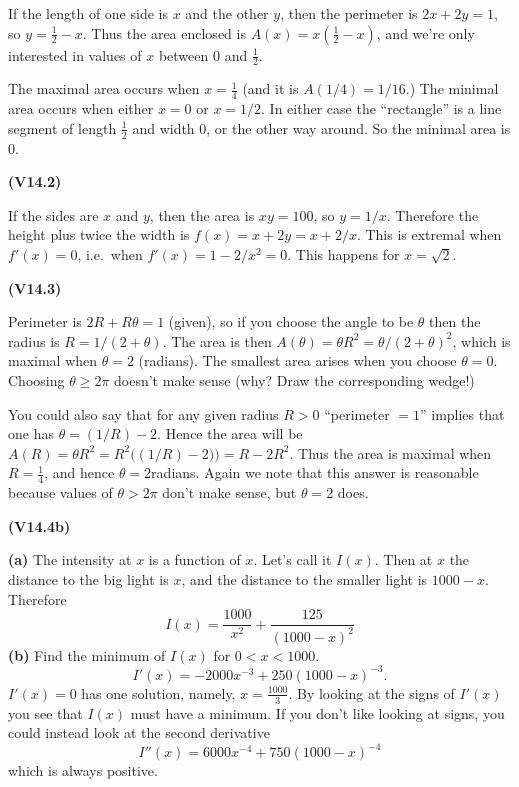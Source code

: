 \documentclass[openany,reqno]{amsbook}
\begin{document}
\begin{trivlist}
  If the length of one side is $x$ and the other $y$, then the perimeter
  is $2x+2y = 1$, so $y=\frac12-x$.  Thus the area enclosed is $A(x) =
  x(\frac12 - x)$, and we're only interested in values of $x$ between
  $0$ and $\tfrac12$.

  The maximal area occurs when $x=\tfrac14$ (and it is $A(1/4) = 1/16$.)
  The minimal area occurs when either $x=0$ or $x=1/2$.  In either case
  the ``rectangle'' is a line segment of length $\frac12$ and width 0,
  or the other way around.  So the minimal area is $0$.
  \bigskip

\item[{\bf(V14.2)}]

  If the sides are $x$ and $y$, then the area is $xy = 100$, so $y=1/x$.
  Therefore the height plus twice the width is $f(x) = x+2y = x+2/x$.
  This is extremal when $f'(x) = 0$, i.e.\ when $f'(x) = 1-2/x^2 = 0$.
  This happens for $x=\sqrt2$.
  \bigskip

\item[{\bf(V14.3)}]

  Perimeter is $2R+R\theta = 1$ (given), so if you choose the angle to
  be $\theta$ then the radius is $R=1/(2+\theta)$.  The area is then
  $A(\theta) = \theta R^2 = \theta/(2+\theta)^2$, which is maximal when
  $\theta=2$ (radians).  The smallest area arises when you choose
  $\theta=0$.  Choosing $\theta\ge 2\pi$ doesn't make sense (why?  Draw
  the corresponding wedge!)

  You could also say that for any given radius $R>0$ ``perimeter
  $=1$'' implies that one has $\theta = (1/R)-2$.  Hence the area
  will be $A(R) =\theta R^2 = R^2\bigl( (1/R)-2 )\bigr) = R-2R^2$.
  Thus the area is maximal when $R=\frac14$, and hence
  $\theta=2$radians.  Again we note that this answer is reasonable
  because values of $\theta>2\pi$ don't make sense, but $\theta=2$
  does.
  \bigskip

\item[{\bf(V14.4b)}]

  \textbf{(a)} The intensity at $x$ is a function of $x$.  Let's
  call it $I(x)$.  Then at $x$ the distance to the big light is
  $x$, and the distance to the smaller light is $1000-x$. Therefore
  \[
    I(x) = \frac{1000}{x^2} + \frac{125}{(1000-x)^2}
  \]
  \textbf{(b)} Find the minimum of $I(x)$ for $0<x<1000$.
  \[
    I'(x) = -2000 x^{-3} + 250(1000 - x)^{-3}.
  \]
  $I'(x) = 0$ has one solution, namely, $x= \frac{1000}{3}$.
  By looking at the signs of $I'(x)$ you see that $I(x)$ must have a
  minimum.  If you don't like looking at signs, you could instead
  look at the second derivative
  \[
    I''(x) = 6000 x^{-4} + 750 (1000 - x)^{-4}
  \]
  which is always positive.
  \bigskip


\end{trivlist}
\end{document}

